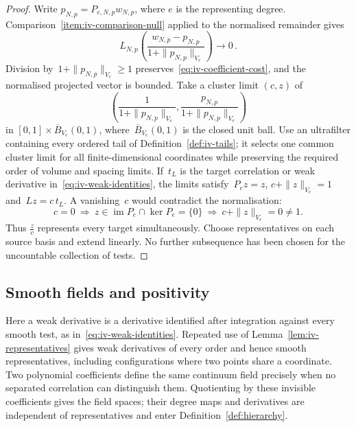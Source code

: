 \begin{proof}
Write $p_{N,p}=P_{e,N,p}w_{N,p}$, where $e$ is the representing degree.
Comparison~\ref{item:iv-comparison-null} applied to the normalised remainder gives
\begin{equation*}
L_{N,p}\left(\frac{w_{N,p}-p_{N,p}}{1+\|p_{N,p}\|_{V_e}}\right)\longrightarrow0\,.
\end{equation*}
Division by~$1+\|p_{N,p}\|_{V_e}\ge1$ preserves~\eqref{eq:iv-coefficient-cost}, and the normalised projected vector is bounded.
Take a cluster limit $(c,z)$ of
\begin{equation*}
\left(\frac{1}{1+\|p_{N,p}\|_{V_e}},\frac{p_{N,p}}{1+\|p_{N,p}\|_{V_e}}\right)
\end{equation*}
in $[0,1]\times\overline B_{V_e}(0,1)$, where~$\overline B_{V_e}(0,1)$ is the closed unit ball.
Use an ultrafilter containing every ordered tail of Definition~\ref{def:iv-tails}; it selects one common cluster limit for all finite-dimensional coordinates while preserving the required order of volume and spacing limits.
If~$t_L$ is the target correlation or weak derivative in~\eqref{eq:iv-weak-identities}, the limits satisfy~$P_ez=z$, $c+\|z\|_{V_e}=1$ and~$Lz=c\,t_L$.
A vanishing~$c$ would contradict the normalisation:
\begin{equation*}
 c=0\ \Longrightarrow\ z\in\operatorname{im}P_e\cap\ker P_e=\{0\}
 \ \Longrightarrow\ c+\|z\|_{V_e}=0\ne1.
\end{equation*}
Thus $\frac{z}{c}$ represents every target simultaneously.
Choose representatives on each source basis and extend linearly.
No further subsequence has been chosen for the uncountable collection of tests.
\end{proof}

\subsection{Smooth fields and positivity}\label{subsec:iv-smoothness}

Here a weak derivative is a derivative identified after integration against every smooth test, as in~\eqref{eq:iv-weak-identities}. Repeated use of Lemma~\ref{lem:iv-representatives} gives weak derivatives of every order and hence smooth representatives, including configurations where two points share a coordinate.
Two polynomial coefficients define the same continuum field precisely when no separated correlation can distinguish them. Quotienting by these invisible coefficients gives the field spaces; their degree maps and derivatives are independent of representatives and enter Definition~\ref{def:hierarchy}.


